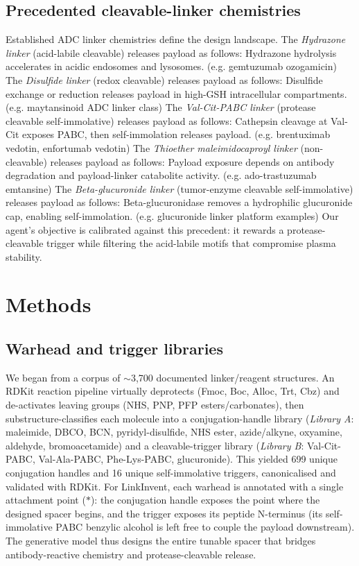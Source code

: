 \documentclass[10pt]{article}
\begin{document}
\subsection{Precedented cleavable-linker chemistries}
Established ADC linker chemistries define the design landscape. The \emph{Hydrazone linker} (acid-labile cleavable) releases payload as follows: Hydrazone hydrolysis accelerates in acidic endosomes and lysosomes. (e.g. gemtuzumab ozogamicin) The \emph{Disulfide linker} (redox cleavable) releases payload as follows: Disulfide exchange or reduction releases payload in high-GSH intracellular compartments. (e.g. maytansinoid ADC linker class) The \emph{Val-Cit-PABC linker} (protease cleavable self-immolative) releases payload as follows: Cathepsin cleavage at Val-Cit exposes PABC, then self-immolation releases payload. (e.g. brentuximab vedotin, enfortumab vedotin) The \emph{Thioether maleimidocaproyl linker} (non-cleavable) releases payload as follows: Payload exposure depends on antibody degradation and payload-linker catabolite activity. (e.g. ado-trastuzumab emtansine) The \emph{Beta-glucuronide linker} (tumor-enzyme cleavable self-immolative) releases payload as follows: Beta-glucuronidase removes a hydrophilic glucuronide cap, enabling self-immolation. (e.g. glucuronide linker platform examples) Our agent's objective is calibrated against this precedent: it rewards a protease-cleavable trigger while filtering the acid-labile motifs that compromise plasma stability.
\section{Methods}
\subsection{Warhead and trigger libraries}
We began from a corpus of $\sim$3{,}700 documented linker/reagent structures. An RDKit reaction pipeline virtually deprotects (Fmoc, Boc, Alloc, Trt, Cbz) and de-activates leaving groups (NHS, PNP, PFP esters/carbonates), then substructure-classifies each molecule into a conjugation-handle library (\emph{Library A}: maleimide, DBCO, BCN, pyridyl-disulfide, NHS ester, azide/alkyne, oxyamine, aldehyde, bromoacetamide) and a cleavable-trigger library (\emph{Library B}: Val-Cit-PABC, Val-Ala-PABC, Phe-Lys-PABC, glucuronide). This yielded 699 unique conjugation handles and 16 unique self-immolative triggers, canonicalised and validated with RDKit.
For LinkInvent, each warhead is annotated with a single attachment point ($*$): the conjugation handle exposes the point where the designed spacer begins, and the trigger exposes its peptide N-terminus (its self-immolative PABC benzylic alcohol is left free to couple the payload downstream). The generative model thus designs the entire tunable spacer that bridges antibody-reactive chemistry and protease-cleavable release.
\end{document}
